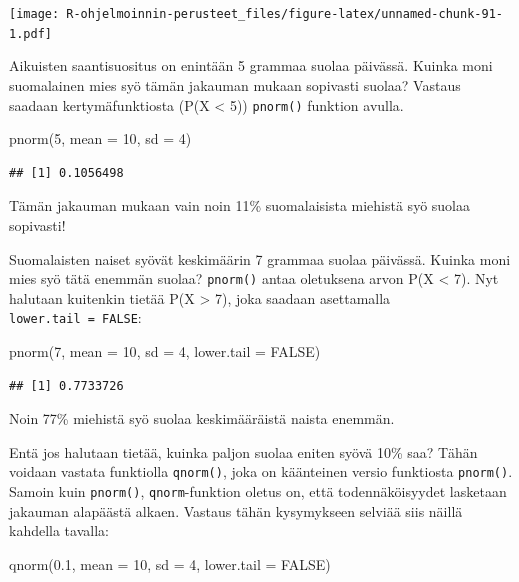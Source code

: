 \documentclass[
]{book}
\newenvironment{Shaded}{\begin{snugshade}}{\end{snugshade}}
\newcommand{\AttributeTok}[1]{\textcolor[rgb]{0.77,0.63,0.00}{#1}}
\newcommand{\ConstantTok}[1]{\textcolor[rgb]{0.00,0.00,0.00}{#1}}
\newcommand{\DecValTok}[1]{\textcolor[rgb]{0.00,0.00,0.81}{#1}}
\newcommand{\FloatTok}[1]{\textcolor[rgb]{0.00,0.00,0.81}{#1}}
\newcommand{\FunctionTok}[1]{\textcolor[rgb]{0.00,0.00,0.00}{#1}}
\newcommand{\NormalTok}[1]{#1}
\begin{document}
\texttt{[image: R-ohjelmoinnin-perusteet\_files/figure-latex/unnamed-chunk-91-1.pdf]}

Aikuisten saantisuositus on enintään 5 grammaa suolaa päivässä. Kuinka moni suomalainen mies syö tämän jakauman mukaan sopivasti suolaa? Vastaus saadaan kertymäfunktiosta (P(X \textless{} 5)) \texttt{pnorm()} funktion avulla.

\begin{Shaded}
\begin{Highlighting}[]
\FunctionTok{pnorm}\NormalTok{(}\DecValTok{5}\NormalTok{, }\AttributeTok{mean =} \DecValTok{10}\NormalTok{, }\AttributeTok{sd =} \DecValTok{4}\NormalTok{)}
\end{Highlighting}
\end{Shaded}

\begin{verbatim}
## [1] 0.1056498
\end{verbatim}

Tämän jakauman mukaan vain noin 11\% suomalaisista miehistä syö suolaa sopivasti!

Suomalaisten naiset syövät keskimäärin 7 grammaa suolaa päivässä. Kuinka moni mies syö tätä enemmän suolaa? \texttt{pnorm()} antaa oletuksena arvon P(X \textless{} 7). Nyt halutaan kuitenkin tietää P(X \textgreater{} 7), joka saadaan asettamalla \texttt{lower.tail\ =\ FALSE}:

\begin{Shaded}
\begin{Highlighting}[]
\FunctionTok{pnorm}\NormalTok{(}\DecValTok{7}\NormalTok{, }\AttributeTok{mean =} \DecValTok{10}\NormalTok{, }\AttributeTok{sd =} \DecValTok{4}\NormalTok{, }\AttributeTok{lower.tail =} \ConstantTok{FALSE}\NormalTok{)}
\end{Highlighting}
\end{Shaded}

\begin{verbatim}
## [1] 0.7733726
\end{verbatim}

Noin 77\% miehistä syö suolaa keskimääräistä naista enemmän.

Entä jos halutaan tietää, kuinka paljon suolaa eniten syövä 10\% saa? Tähän voidaan vastata funktiolla \texttt{qnorm()}, joka on käänteinen versio funktiosta \texttt{pnorm()}. Samoin kuin \texttt{pnorm()}, \texttt{qnorm}-funktion oletus on, että todennäköisyydet lasketaan jakauman alapäästä alkaen. Vastaus tähän kysymykseen selviää siis näillä kahdella tavalla:

\begin{Shaded}
\begin{Highlighting}[]
\FunctionTok{qnorm}\NormalTok{(}\FloatTok{0.1}\NormalTok{, }\AttributeTok{mean =} \DecValTok{10}\NormalTok{, }\AttributeTok{sd =} \DecValTok{4}\NormalTok{, }\AttributeTok{lower.tail =} \ConstantTok{FALSE}\NormalTok{)}
\end{Highlighting}
\end{Shaded}
\end{document}

